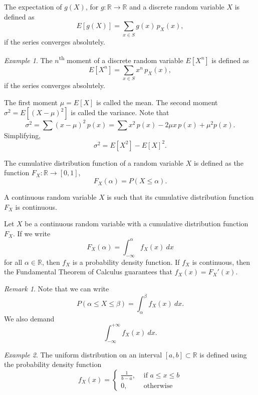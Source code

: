 \documentclass[11pt]{article}
\def\R{\mathbb{R}}
\newcommand\E[1]{E[#1]}
\theoremstyle{definition}
\theoremstyle{remark}
\newtheorem*{remark}{Remark}
\newtheorem*{example}{Example}
\numberwithin{equation}{module}
\begin{document}
    \begin{definition}[Expectation]
        The expectation of $g(X)$, for $g\colon \R \to \R$ and a discrete random
        variable $X$ is defined as \[
            \E{g(X)} = \sum_{x \in S} g(x)\,p_X(x),
        \] if the series converges absolutely.
    \end{definition}
    \begin{example}
        The $n$\textsuperscript{th} moment of a discrete random variable $\E{X^n}$
        is defined as \[
            \E{X^n} = \sum_{x \in S} x^n\,p_X(x),
        \] if the series converges absolutely.

        The first moment $\mu = \E{X}$ is called the mean.
        The second moment $\sigma^2 = \E{(X - \mu)^2}$ is called the variance.
        Note that \[
            \sigma^2 = \sum (x - \mu)^2\, p(x) = \sum x^2\,p(x) - 2\mu x\,p(x) +
            \mu^2 p(x).
        \] Simplifying, \[
            \sigma^2 = \E{X^2} - \E{X}^2.
        \] 
    \end{example}

    \begin{definition}
        The cumulative distribution function of a random variable $X$ is
        defined as the function $F_X\colon \R \to [0, 1]$, \[
            F_X(\alpha) = P(X \leq \alpha).
        \] 
    \end{definition}

    \begin{definition}
        A continuous random variable $X$ is such that its cumulative distribution
        function $F_X$ is continuous.
    \end{definition}

    \begin{definition}
        Let $X$ be a continuous random variable with a cumulative distribution
        function $F_X$. If we write \[
            F_X(\alpha) = \int_{-\infty}^\alpha f_X(x)\:dx
        \] for all $\alpha \in \R$, then $f_X$ is a probability density function.
        If $f_X$ is continuous, then the Fundamental Theorem of Calculus guarantees
        that $f_X(x) = F_X'(x)$.
        \begin{remark}
            Note that we can write \[
                P(\alpha \leq X \leq \beta) = \int_\alpha^\beta f_X(x)\:dx.
            \] We also demand \[
                \int_{-\infty}^{+\infty} f_X(x) \:dx.
            \] 
        \end{remark}
    \end{definition}
    \begin{example}
        The uniform distribution on an interval $[a, b] \subset \R$ is defined using
        the probability density function \[
            f_X(x) = \begin{cases}
                \frac{1}{b - a}, &\text{ if }a \leq x \leq b \\
                0, &\text{ otherwise }
            \end{cases}
        \]
    \end{example}
\end{document}
